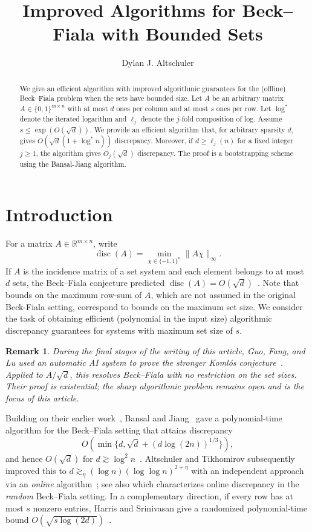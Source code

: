 \documentclass[reqno]{amsart}
\title{Improved Algorithms for Beck--Fiala with Bounded Sets}
\author{Dylan J. Altschuler}
\date{}
\newtheorem{remark}[theorem]{Remark}
\theoremstyle{definition}
\DeclareMathOperator{\disc}{disc}
\newcommand{\R}{\mathbb R}
\newcommand{\norm}[1]{\lVert#1\rVert}
\begin{document}
\maketitle
\vspace{-1.2em}

\begin{abstract}
We give an efficient algorithm with improved algorithmic guarantees for the (offline) Beck--Fiala problem when the sets have bounded size.  Let $A$ be an arbitrary matrix $A\in\{0,1\}^{m\times n}$ with at most $d$ ones per column and at most $s$ ones per row. Let $\log^*$ denote the iterated logarithm and $\ell_j$ denote the $j$-fold composition of log. Assume $s\le\exp(O(\sqrt d))$. We provide an efficient algorithm that, for arbitrary sparsity $d$, gives $O(\sqrt d(1+\log^*n))$ discrepancy. Moreover, if $d\ge\ell_j(n)$ for a fixed integer $j\ge1$, the algorithm gives $O_j(\sqrt d)$ discrepancy.  The proof is a bootstrapping scheme using the Bansal-Jiang algorithm.
\end{abstract}

\section{Introduction}

For a matrix $A\in\R^{m\times n}$, write
\[ \disc(A)=\min_{\chi\in\{-1,1\}^n}\norm{A\chi}_\infty. \]
If $A$ is the incidence matrix of a set system and each element belongs to at most $d$ sets, the Beck--Fiala conjecture predicted $\disc(A)=O(\sqrt d)$~\cite{BF}. Note that bounds on the maximum row-sum of $A$, which are not assumed in the original Beck-Fiala setting, correspond to bounds on the maximum set size. We consider the task of obtaining efficient (polynomial in the input size) algorithmic discrepancy guarantees for systems with maximum set size of $s$.

\begin{remark}
During the final stages of the writing of this article, Guo, Fang, and Lu used an automatic AI system to prove the stronger Koml\'os conjecture~\cite{GFL}.  Applied to $A/\sqrt d$, this resolves Beck--Fiala with no restriction on the set sizes.  Their proof is existential; the sharp algorithmic problem remains open and is the focus of this article.
\end{remark}

Building on their earlier work~\cite{BJearly}, Bansal and Jiang~\cite{BJ} gave a polynomial-time algorithm for the Beck--Fiala setting that attains discrepancy
\begin{equation}\label{eq:BJ} O\!\left(\min\{d,\sqrt d+(d\log(2n))^{1/3}\}\right), \end{equation}
and hence $O(\sqrt d)$ for $d\gtrsim\log^2n$~\cite[Theorem~5.1]{BJ}. Altschuler and Tikhomirov subsequently improved this to $d\gtrsim_\eta(\log n)(\log\log n)^{2+\eta}$ with an independent approach via an \textit{online} algorithm~\cite{AT}; see also \cite{AT2} which characterizes online discrepancy in the \textit{random} Beck--Fiala setting.  In a complementary direction, if every row has at most $s$ nonzero entries, Harris and Srinivasan give a randomized polynomial-time bound $O(\sqrt{s\log(2d)})$~\cite[Theorem~5.2]{HS}.
\end{document}
